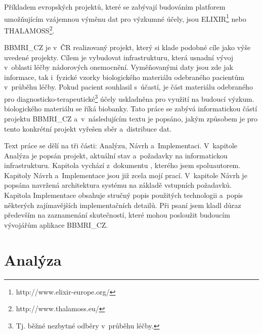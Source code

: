 \documentclass[11pt, final, oneside]{fithesis2}
\newcommand{\ProjectName}{\mbox{BBMRI\_CZ}\xspace}
\begin{document}
Příkladem evropských projektů, které se zabývají budováním platforem umožňujícím vzájemnou výměnu dat pro výzkumné účely, jsou ELIXIR\footnote{http://www.elixir-europe.org/} nebo THALAMOSS\footnote{http://www.thalamoss.eu/}. 

\ProjectName je v~ČR realizovaný projekt, který si klade podobné cíle jako výše uvedené projekty. Cílem je vybudovat infrastrukturu, která usnadní vývoj v~oblasti léčby nádorových onemocnění. Vyměňovanými daty jsou zde jak informace, tak i~fyzické vzorky biologického materiálu odebraného pacientům v~průběhu léčby. Pokud pacient souhlasil s~účastí, je část materiálu odebraného pro diagnosticko-terapeutické\footnote{Tj. běžné nezbytné odběry v~průběhu léčby.} účely uskladněna pro využití na budoucí výzkum.  biologického materiálu se říká biobanky. 
Tato práce se zabývá informatickou částí projektu \ProjectName a~v~následujícím textu je popsáno, jakým způsobem je pro tento konkrétní projekt vyřešen sběr a~distribuce dat. 

Text práce se dělí na tři části: Analýzu, Návrh a~Implementaci. V~kapitole Analýza je popsán projekt, aktuální stav a~požadavky na informatickou infrastrukturu. Kapitola vychází z~dokumentu \cite{ARCH_2014_1_25}, kterého jsem spoluautorem. Kapitoly Návrh a~Implementace jsou již zcela mojí prací. V~kapitole Návrh je popsána navržená architektura systému na základě vstupních požadavků. Kapitola Implementace obsahuje stručný popis použitých technologii a~popis některých zajímavějších implementačních detailů. Při psaní jsem kladl důraz především na zaznamenání skutečností, které mohou posloužit budoucím vývojářům aplikace \ProjectName.

\chapter{Analýza}\label{chapter:analysis}

\end{document}
